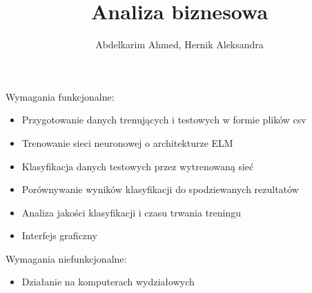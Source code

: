 \documentclass{article}
\title{Analiza biznesowa}
\author{Abdelkarim Ahmed, Hernik Aleksandra}
\begin{document}
\maketitle
\noindent
Wymagania funkcjonalne:
\begin{itemize}
\item Przygotowanie danych trenujących i testowych w formie plików csv
\item Trenowanie sieci neuronowej o architekturze ELM
\item Klasyfikacja danych testowych przez wytrenowaną sieć
\item Porównywanie wyników klasyfikacji do spodziewanych rezultatów
\item Analiza jakości klasyfikacji i  czasu trwania treningu
\item Interfejs graficzny
\end{itemize}
Wymagania niefunkcjonalne:
\begin{itemize}
\item Działanie na komputerach wydziałowych
\end{itemize}
\end{document}
